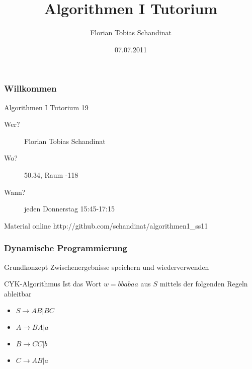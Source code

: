 \documentclass{beamer}
\title{Algorithmen I Tutorium}
\author{Florian Tobias Schandinat}
\date{07.07.2011}
\institute{FTS}
\begin{document}
\begin{frame}
\frametitle{Willkommen}
\begin{block}{Algorithmen I Tutorium 19}
\begin{description}
\item[Wer?] Florian Tobias Schandinat\\
\item[Wo?] 50.34, Raum -118\\
\item[Wann?] jeden Donnerstag 15:45-17:15
\end{description}
\end{block}

\begin{block}{Material online}
http://github.com/schandinat/algorithmen1\_ss11
\end{block}
\end{frame}




\begin{frame}
\frametitle{Dynamische Programmierung}
\begin{alertblock}{Grundkonzept}
Zwischenergebnisse speichern und wiederverwenden
\end{alertblock}

\begin{exampleblock}{CYK-Algorithmus}
Ist das Wort $w = bbabaa$ aus $S$ mittels der folgenden Regeln ableitbar
\begin{itemize}
\item $S \rightarrow AB | BC$
\item $A \rightarrow BA | a$
\item $B \rightarrow CC | b$
\item $C \rightarrow AB | a$
\end{itemize}
\end{exampleblock}
\end{frame}
\end{document}
